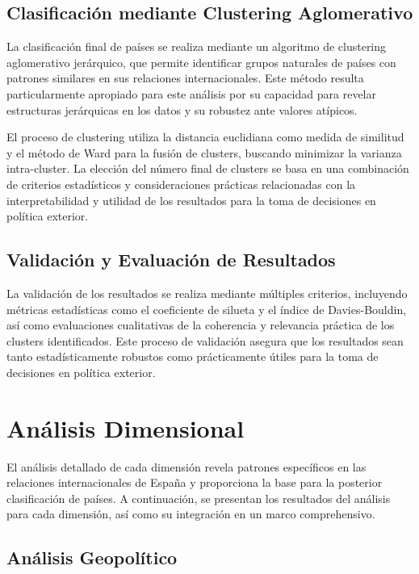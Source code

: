 \documentclass[11pt,a4paper]{article}
\begin{document}
\subsection{Clasificación mediante Clustering Aglomerativo}

La clasificación final de países se realiza mediante un algoritmo de clustering aglomerativo jerárquico, que permite identificar grupos naturales de países con patrones similares en sus relaciones internacionales. Este método resulta particularmente apropiado para este análisis por su capacidad para revelar estructuras jerárquicas en los datos y su robustez ante valores atípicos.

El proceso de clustering utiliza la distancia euclidiana como medida de similitud y el método de Ward para la fusión de clusters, buscando minimizar la varianza intra-cluster. La elección del número final de clusters se basa en una combinación de criterios estadísticos y consideraciones prácticas relacionadas con la interpretabilidad y utilidad de los resultados para la toma de decisiones en política exterior.

\subsection{Validación y Evaluación de Resultados}

La validación de los resultados se realiza mediante múltiples criterios, incluyendo métricas estadísticas como el coeficiente de silueta y el índice de Davies-Bouldin, así como evaluaciones cualitativas de la coherencia y relevancia práctica de los clusters identificados. Este proceso de validación asegura que los resultados sean tanto estadísticamente robustos como prácticamente útiles para la toma de decisiones en política exterior.
\section{Análisis Dimensional}

El análisis detallado de cada dimensión revela patrones específicos en las relaciones internacionales de España y proporciona la base para la posterior clasificación de países. A continuación, se presentan los resultados del análisis para cada dimensión, así como su integración en un marco comprehensivo.

\subsection{Análisis Geopolítico}
\end{document}
